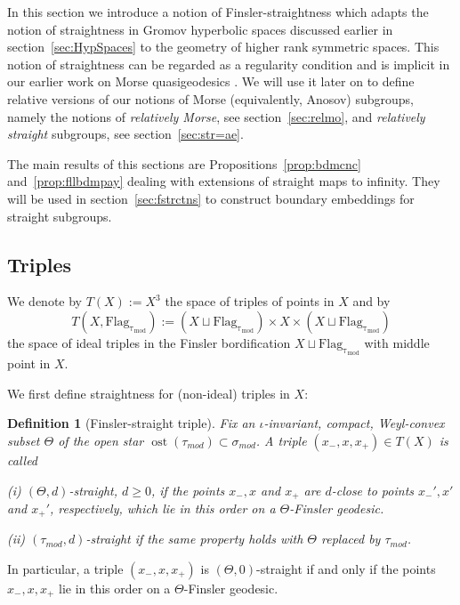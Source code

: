 \documentclass[12pt]{article}
\theoremstyle{boldplain}
\theoremstyle{bolddefinition}
\newtheorem{definition}[equation]{Definition}
\numberwithin{equation}{section}
\def\si{\sigma}
\def\Flagt{\operatorname{Flag_{\tau_{mod}}}}
\def\simod{\si_{mod}}
\def\ost{\operatorname{ost}}
\def\taumod{\tau_{mod}}
\begin{document}
In this section we introduce a notion of Finsler-straightness 
which adapts the notion of straightness in Gromov hyperbolic spaces 
discussed earlier in section~\ref{sec:HypSpaces}
to the geometry of higher rank symmetric spaces. 
This notion of straightness can be regarded as a regularity condition and 
is implicit in our earlier work on Morse quasigeodesics \cite{morse}. 
We will use it later on to define relative versions of our notions of Morse (equivalently, Anosov) subgroups,
namely the notions of {\em relatively Morse}, see section~\ref{sec:relmo},
and {\em relatively straight} subgroups, see section~\ref{sec:str=ae}.

The main results of this sections are Propositions~\ref{prop:bdmcnc} and~\ref{prop:fllbdmpay}
dealing with extensions of straight maps to infinity.
They will be used in section~\ref{sec:fstrctns} to construct boundary embeddings for straight subgroups.

\subsection{Triples}

We denote by $T(X):=X^3$ the space of triples of points in $X$ and by 
\begin{equation*}
T(X,\Flagt):=(X\sqcup\Flagt)\times X\times (X\sqcup\Flagt)
\end{equation*}
the space of ideal triples in the Finsler bordification $X\sqcup\Flagt$
with middle point in $X$.

We first define straightness for (non-ideal) triples in $X$:


\begin{definition}[Finsler-straight triple] 
\label{defn:diamondstraight}
{Fix an $\iota$-invariant, compact, Weyl-convex subset $\Theta$ of the open star $\ost(\taumod)\subset\simod$.} 
A triple $(x_-,x,x_+)\in T(X)$ is called

(i) 
{\em $(\Theta,d)$-straight}, 
$d\geq0$, 
if the points $x_-,x$ and $x_+$ are $d$-close to points $x_-',x'$ and $x_+'$,
respectively, 
which lie in this order on a $\Theta$-Finsler geodesic.

(ii) {\em $(\taumod,d)$-straight} if the same property holds with $\Theta$ replaced by $\taumod$.
\end{definition}



In particular, 
a triple $(x_-,x,x_+)$ is $(\Theta,0)$-straight if and only if 
the points $x_-,x,x_+$ lie in this order on a $\Theta$-Finsler geodesic.
\end{document}
